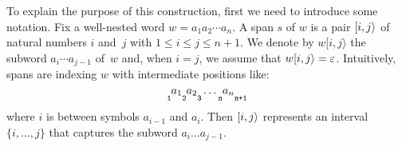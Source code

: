 
To explain the purpose of this construction, first we need to introduce some notation.
Fix a well-nested word $w = a_1 a_2 \cdots a_n$. A span $s$ of $w$ is a pair $[i,j\rangle$ of natural numbers $i$ and~$j$ with $1 \leq i \leq j \leq n+1$. 
We denote by $w[i,j\rangle$ the subword $a_i\cdots a_{j-1}$ of~$w$ and, when $i = j$, we assume that $w[i,j\rangle = \varepsilon$.
Intuitively, spans are indexing $w$ with intermediate positions like: 
\[
\underset{\tiny\texttt 1}{}a_1 \underset{\tiny\texttt 2}{}a_2 \underset{\tiny\texttt 3}{} \ldots \underset{\tiny\texttt n}{} a_n \underset{\tiny\texttt{n+1}}{}
\] 
where $i$ is between symbols $a_{i-1}$ and $a_i$. Then $[i,j\rangle$ represents an interval $\{i, \ldots, j\}$ that captures the subword $a_i \ldots a_{j-1}$.


